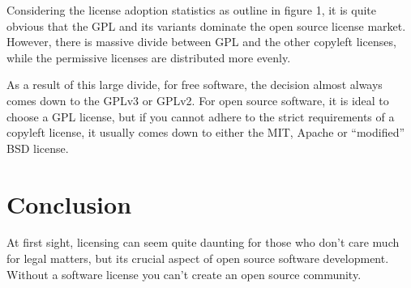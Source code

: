 \documentclass[12pt,letterpaper]{article}
\begin{document}
Considering the license adoption statistics as outline in figure 1, it is quite obvious that the GPL and its variants dominate the open source license market. However, there is massive divide between GPL and the other copyleft licenses, while the permissive licenses are distributed more evenly.

As a result of this large divide, for free software, the decision almost always comes down to the GPLv3 or GPLv2. For open source software, it is ideal to choose a GPL license, but if you cannot adhere to the strict requirements of a copyleft license, it usually comes down to either the MIT, Apache or ``modified'' BSD license.

\section{Conclusion}
At first sight, licensing can seem quite daunting for those who don't care much for legal matters, but its crucial aspect of open source software development. Without a software license you can't create an open source community.

\newpage
\end{document}
